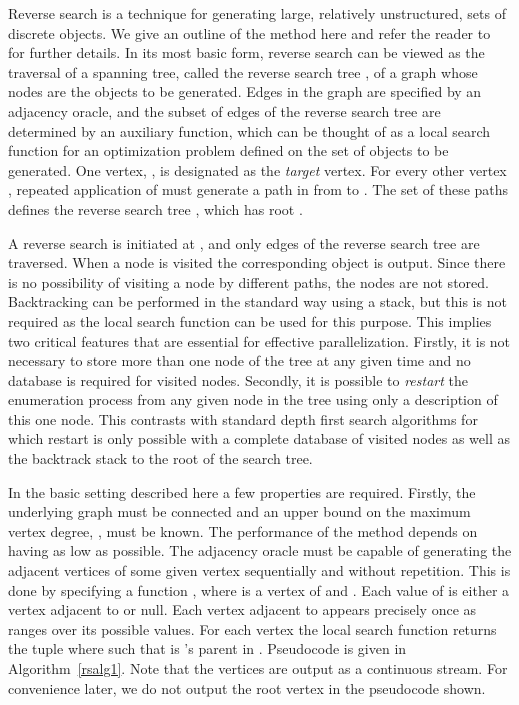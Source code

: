 \documentclass[a4paper,11pt]{article}   \usepackage{authblk} \usepackage[top=1.9cm,bottom=1.9cm,left=1.9cm,right=1.9cm]{geometry}
\begin{document}
Reverse search is a technique for generating large, relatively unstructured, sets of discrete
objects. We give an outline of the method here and refer the reader to~\cite{AF92,AF93}
for further details.
In its most basic form, reverse search can be viewed as the traversal of a spanning tree, called the reverse
search tree , of a graph  whose nodes are the objects to be generated. Edges in the graph are
specified by an adjacency oracle, and the subset of edges of the reverse search tree are
determined by an auxiliary function, which can be thought of as a local search function  for an
optimization problem defined on the set of objects to be generated. One vertex, , is designated
as the \emph{target} vertex. For every other vertex ,
repeated application of  must generate a
path in  from  to . The set of these paths defines the reverse search tree , which has root .

A reverse search is initiated at , and only edges of the reverse search tree are traversed.
When a node is visited the corresponding object is output.  Since there is no possibility of
visiting a node by different paths, the nodes are not stored.  Backtracking can be performed in the
standard way using a stack, but this is not required as the local search function can be used for
this purpose. This implies two critical features that are essential for effective parallelization.
Firstly, it is not necessary to store more than one node of the tree at any
given time and no database is required for visited nodes. 
Secondly, it is possible to \emph{restart} the enumeration process from
any given node in the tree using only a description of this one node.
This contrasts with standard depth first search algorithms for which restart
is only possible with a complete database of visited nodes as well as the backtrack stack
to the root of the search tree.

In the basic setting described here a few properties are required. Firstly, the
underlying graph  must be connected and an upper bound on the maximum vertex degree, , must
be known.  The performance of the method depends on  having  as low as
possible.  The adjacency oracle must be capable of generating the adjacent vertices of some given
vertex  sequentially and without repetition.  This is done by specifying a function  
, where  is a vertex of  and .  Each value of  is
either a vertex adjacent to  or null. Each vertex adjacent to  appears precisely once as  ranges
over its possible values.  For each vertex 
the local search function  returns the tuple  where  such that 
is 's parent in .
Pseudocode is given in Algorithm~\ref{rsalg1}.
Note that the vertices are output as a continuous stream.
For convenience later, we do not output the root vertex  in the pseudocode shown.
\end{document}
